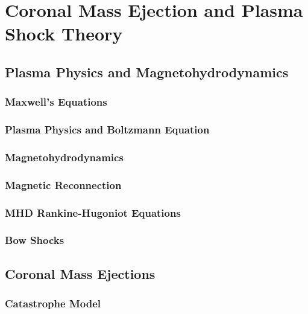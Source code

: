 \chapter{Coronal Mass Ejection and Plasma Shock Theory} 
\label{chap:2}

\section{Plasma Physics and Magnetohydrodynamics}\label{sec:1}

\subsection{Maxwell's Equations}\label{sec:10}

\subsection{Plasma Physics and Boltzmann Equation}\label{sec:11}

\subsection{Magnetohydrodynamics}\label{sec:12}

\subsection{Magnetic Reconnection}\label{sec:13}

\subsection{MHD Rankine-Hugoniot Equations}\label{sec:14}

\subsection{Bow Shocks}\label{sec:15}



\section{Coronal Mass Ejections}\label{sec:2}

\subsection{Catastrophe Model}\label{sec:20}

